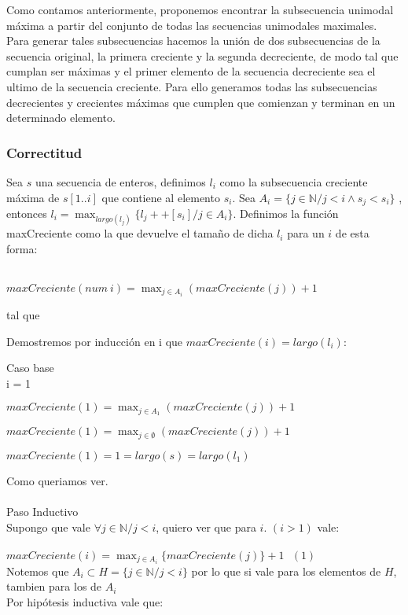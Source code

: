 Como contamos anteriormente, proponemos encontrar la subsecuencia unimodal máxima a partir del conjunto de todas las secuencias unimodales maximales. Para generar tales subsecuencias hacemos la unión de dos subsecuencias de la secuencia original, la primera creciente y la segunda decreciente, de modo tal que cumplan ser máximas y el primer elemento de la secuencia decreciente sea el ultimo de la secuencia creciente. Para ello generamos todas las subsecuencias decrecientes y crecientes máximas que cumplen que comienzan y terminan en un determinado elemento.

\subsubsection{Correctitud}
Sea $s$ una secuencia de enteros, definimos $l_i$ como la subsecuencia creciente máxima 
de $s[1..i]$ que contiene al elemento $s_i$. Sea 
$A_i = \{ j \in \mathbb{N} / j < i \land s_j < s_i \}$ , entonces 
$\displaystyle l_i = \max_{largo(l_j)}\{l_j ++ [s_i] / j \in A_i\}$. Definimos la función maxCreciente como la que devuelve 
el tamaño de dicha $l_i$ para un $i$ de esta forma:\\
\\
    \centerline{$ \displaystyle maxCreciente(num\ i) = \max_{j \in A_i} (maxCreciente(j)) + 1$} 
    \centerline{tal que }

Demostremos por inducción en i que $maxCreciente(i) = largo(l_i)$:

Caso base\\
i = 1 \\
\centerline{$\displaystyle maxCreciente(1) = \max_{j \in A_1} (maxCreciente(j)) + 1$}
\centerline{$\displaystyle maxCreciente(1) = \max_{j \in \emptyset} (maxCreciente(j)) + 1$}
\centerline{$\displaystyle maxCreciente(1) = 1 = largo(s) = largo(l_1)$} 
Como queriamos ver.\\
\\
Paso Inductivo\\
Supongo que vale $\forall j \in \mathbb{N} / j < i$, quiero ver que para $i$. $(i > 1)$ vale:\\
\\
$\displaystyle maxCreciente(i) = \max_{j \in A_i} \{maxCreciente(j)\} + 1 \ \ \ (1)$\\

Notemos que $ A_i \subset H = \{ j \in \mathbb{N} / j < i\} $ por lo que si vale para los elementos de $H$, tambien para los de $A_i$\\
Por hipótesis inductiva vale que:\\

